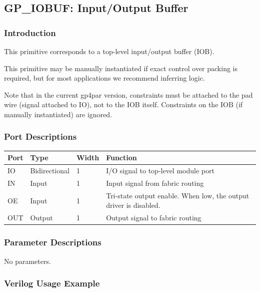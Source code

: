 \documentclass[11pt]{article}
\begin{document}

\pagebreak
\subsection{GP\_IOBUF: Input/Output Buffer}

\subsubsection{Introduction}
This primitive corresponds to a top-level input/output buffer (IOB).

This primitive may be manually instantiated if exact control over packing is required, but for most applications we 
recommend inferring logic.

Note that in the current gp4par version, constraints must be attached to the pad wire (signal attached to IO), not 
to the IOB itself. Constraints on the IOB (if manually instantiated) are ignored.

\subsubsection{Port Descriptions}

\begin{tabularx}{4in}{|l|l|l|X|}
\hline
{\bfseries Port} & {\bfseries Type} & {\bfseries Width} & {\bfseries Function} \\
\hline
IO & Bidirectional & 1 & I/O signal to top-level module port \\
\hline
IN & Input & 1 & Input signal from fabric routing \\
\hline
OE & Input & 1 & Tri-state output enable. When low, the output driver is disabled. \\
\hline
OUT & Output & 1 & Output signal to fabric routing \\
\hline
\end{tabularx}

\subsubsection{Parameter Descriptions}

No parameters.

\pagebreak
\subsubsection{Verilog Usage Example}
\end{document}
